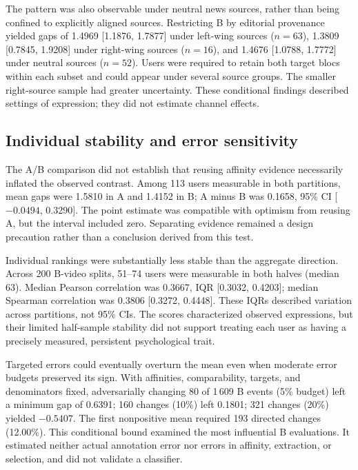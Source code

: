 \documentclass[conference, letterpaper]{IEEEtran}
\begin{document}
The pattern was also observable under neutral news sources, rather than being confined to explicitly aligned sources. Restricting B by editorial provenance yielded gaps of 1.4969 [1.1876, 1.7877] under left-wing sources ($n=63$), 1.3809 [0.7845, 1.9208] under right-wing sources ($n=16$), and 1.4676 [1.0788, 1.7772] under neutral sources ($n=52$). Users were required to retain both target blocs within each subset and could appear under several source groups. The smaller right-source sample had greater uncertainty. These conditional findings described settings of expression; they did not estimate channel effects.

\subsection{Individual stability and error sensitivity}
The A/B comparison did not establish that reusing affinity evidence necessarily inflated the observed contrast. Among 113 users measurable in both partitions, mean gaps were 1.5810 in A and 1.4152 in B; A minus B was 0.1658, 95\% CI [$-0.0494$, 0.3290]. The point estimate was compatible with optimism from reusing A, but the interval included zero. Separating evidence remained a design precaution rather than a conclusion derived from this test.

Individual rankings were substantially less stable than the aggregate direction. Across 200 B-video splits, 51--74 users were measurable in both halves (median 63). Median Pearson correlation was 0.3667, IQR [0.3032, 0.4203]; median Spearman correlation was 0.3806 [0.3272, 0.4448]. These IQRs described variation across partitions, not 95\% CIs. The scores characterized observed expressions, but their limited half-sample stability did not support treating each user as having a precisely measured, persistent psychological trait.

Targeted errors could eventually overturn the mean even when moderate error budgets preserved its sign. With affinities, comparability, targets, and denominators fixed, adversarially changing 80 of 1\,609 B events (5\% budget) left a minimum gap of 0.6391; 160 changes (10\%) left 0.1801; 321 changes (20\%) yielded $-0.5407$. The first nonpositive mean required 193 directed changes (12.00\%). This conditional bound examined the most influential B evaluations. It estimated neither actual annotation error nor errors in affinity, extraction, or selection, and did not validate a classifier.
\end{document}

